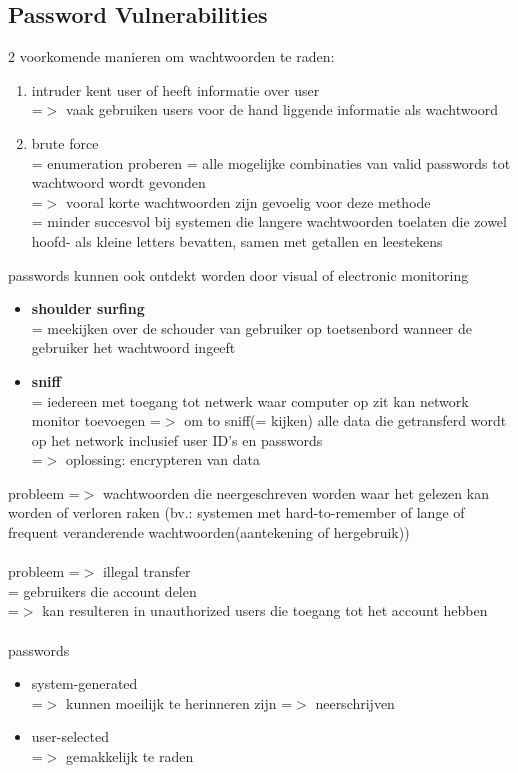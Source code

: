 \documentclass{report}
\begin{document}
\subsection{Password Vulnerabilities}
2 voorkomende manieren om wachtwoorden te raden:
\begin{enumerate}
\item intruder kent user of heeft informatie over user
\\=$>$ vaak gebruiken users voor de hand liggende informatie als wachtwoord
\item brute force
\\= enumeration proberen = alle mogelijke combinaties van valid passwords tot wachtwoord wordt gevonden
\\=$>$ vooral korte wachtwoorden zijn gevoelig voor deze methode
\\= minder succesvol bij systemen die langere wachtwoorden toelaten die zowel hoofd- als kleine letters bevatten, samen met getallen en leestekens
\end{enumerate}
passwords kunnen ook ontdekt worden door visual of electronic monitoring
\begin{itemize}
\item \textbf{shoulder surfing} 
\\ = meekijken over de schouder van gebruiker op toetsenbord wanneer de gebruiker het wachtwoord ingeeft 
\item \textbf{sniff}
\\= iedereen met toegang tot netwerk waar computer op zit kan network monitor toevoegen =$>$ om to sniff(= kijken) alle data die getransferd wordt op het network inclusief user ID's en passwords
\\=$>$ oplossing: encrypteren van data 
\end{itemize}
probleem =$>$ wachtwoorden die neergeschreven worden waar het gelezen kan worden of verloren raken (bv.: systemen met hard-to-remember of lange of frequent veranderende wachtwoorden(aantekening of hergebruik))
\\
\\probleem =$>$ illegal transfer
\\= gebruikers die account delen
\\ =$>$ kan resulteren in unauthorized users die toegang tot het account hebben
\\
\\passwords
\begin{itemize}
\item system-generated
\\=$>$ kunnen moeilijk te herinneren zijn =$>$ neerschrijven 
\item user-selected
\\=$>$ gemakkelijk te raden
\end{itemize}
\end{document}
